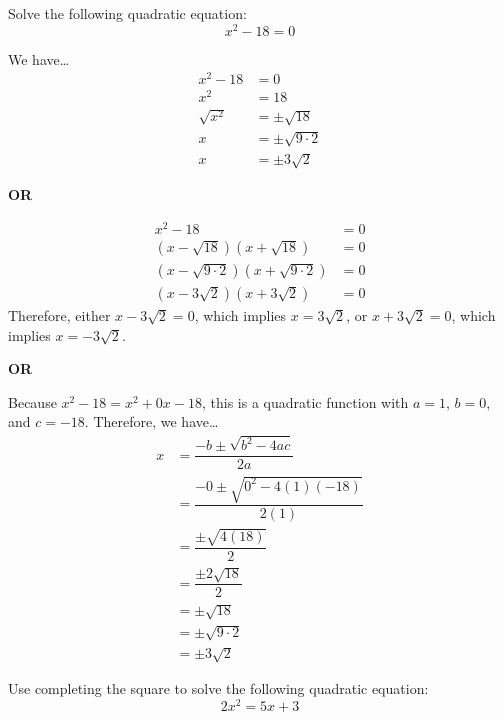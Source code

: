 \documentclass[11pt,letterpaper]{article}
\begin{document}

 Solve the following quadratic equation:
	\[
	x^2 - 18= 0
	\] \pspace

\sol We have\dots
	\[
	\begin{aligned}
	x^2 - 18&= 0 \\
	x^2&= 18 \\
	\sqrt{x^2}&= \pm\sqrt{18} \\
	x&= \pm \sqrt{9 \cdot 2} \\
	x&= \pm 3 \sqrt{2}
	\end{aligned}
	\]

\begin{center} {\bfseries OR} \end{center} 

	\[
	\begin{aligned}
	x^2 - 18&= 0 \\
	(x - \sqrt{18})(x + \sqrt{18})&= 0 \\
	(x - \sqrt{9 \cdot 2})(x + \sqrt{9 \cdot 2})&= 0 \\
	(x - 3\sqrt{2})(x + 3\sqrt{2})&= 0
	\end{aligned}
	\]
Therefore, either $x - 3\sqrt{2}= 0$, which implies $x= 3 \sqrt{2}$, or $x + 3\sqrt{2}= 0$, which implies $x= -3\sqrt{2}$. 

\begin{center} {\bfseries OR} \end{center} 

Because $x^2 - 18= x^2 + 0x - 18$, this is a quadratic function with $a= 1$, $b= 0$, and $c= -18$. Therefore, we have\dots
	\[
	\begin{aligned}
	x&= \dfrac{-b \pm \sqrt{b^2 - 4ac}}{2a} \\
	&= \dfrac{-0 \pm \sqrt{0^2 - 4(1)(-18)}}{2(1)} \\
	&= \dfrac{\pm \sqrt{4(18)}}{2} \\
	&= \dfrac{\pm 2 \sqrt{18}}{2} \\
	&= \pm \sqrt{18} \\
	&= \pm \sqrt{9 \cdot 2} \\
	&= \pm 3 \sqrt{2}
	\end{aligned}
	\]


\newpage



 Use completing the square to solve the following quadratic equation:
	\[
	2x^2= 5x + 3
	\] \pspace
\end{document}
